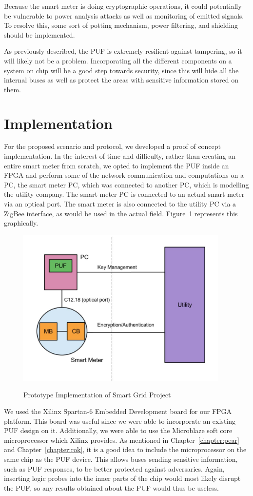 Because the smart meter is doing cryptographic operations, it could potentially be vulnerable to power analysis
attacks as well as monitoring of emitted signals. To resolve this, some sort of potting mechanism, power filtering,
and shielding should be implemented. 

As previously described, the PUF is extremely resilient against tampering, so it will likely not be a problem.
Incorporating all the different components on a system on chip will be a good step towards security, since this will
hide all the internal buses as well as protect the areas with sensitive information stored on them.

\section{Implementation}
For the proposed scenario and protocol, we developed a proof of concept implementation. In the interest of time and
difficulty, rather than creating an entire smart meter from scratch, we opted to implement the 
PUF inside an FPGA and perform some of the network communication and computations on a PC, the smart meter
PC, which was connected to another PC, which is modelling the utility company. The smart meter PC is connected
to an actual smart meter via an optical port. The smart meter is also connected to the utility PC via a ZigBee interface,
as would be used in the actual field. Figure~\ref{fig:doeimpl} represents this graphically.

\begin{figure}[!ht]
\includegraphics[width=400px]{images/doe_impl.jpg}
\label{fig:doeimpl}
\caption{Prototype Implementation of Smart Grid Project}
\end{figure}
\FloatBarrier

We used the Xilinx Spartan-6 Embedded Development board for our FPGA platform. This board was useful since we 
were able to incorporate an existing PUF design on it. Additionally, we were able to use the Microblaze soft core
microprocessor which Xilinx provides. As mentioned in Chapter~\ref{chapter:pear} and Chapter~\ref{chapter:rok},
it is a good idea to include the microprocessor on the same chip as the PUF device. This allows buses sending
sensitive information, such as PUF responses, to be better protected against adversaries. Again, inserting logic
probes into the inner parts of the chip would most likely disrupt the PUF, so any results obtained about the PUF would
thus be useless.

